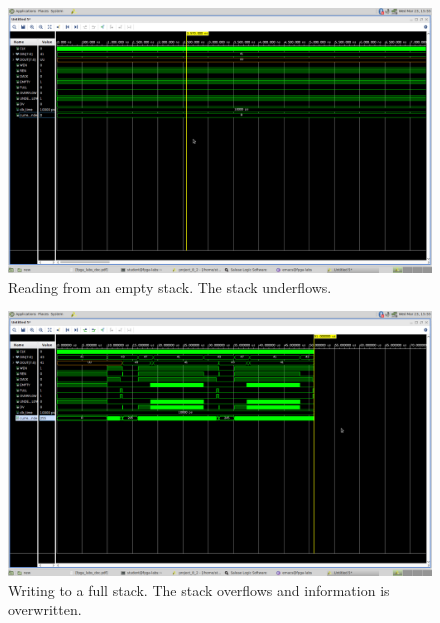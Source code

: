\begin{figure}
    \includegraphics[width=\textwidth]{L8/E2/underflow.png}
    \caption{Reading from an empty stack. The stack underflows.}
    \label{pic: reading from an empty stack}
\end{figure}

\begin{figure}
    \includegraphics[width=\textwidth]{L8/E2/full.png}
    \caption{Writing to a full stack. The stack overflows and information is overwritten.}
    \label{pic: writing to a full stack}
\end{figure}

